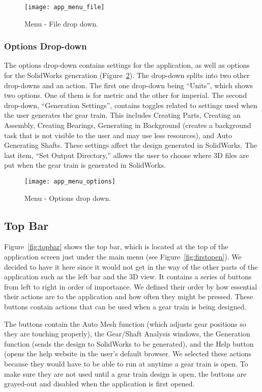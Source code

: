 \begin{doublespace}
\begin{figure}[htbp]
    \centering
    \texttt{[image: app\_menu\_file]}
    \caption{Menu - File drop down.}
    \label{fig:menufile}
\end{figure}

\subsubsection{Options Drop-down}

The options drop-down contains settings for the application, as well as options for the SolidWorks generation (Figure~\ref{fig:menuOptions}). The drop-down splits into two other drop-downs and an action. The first one drop-down being ``Units'', which shows two options. One of them is for metric and the other for imperial. The second drop-down, ``Generation Settings'', contains toggles related to settings used when the user generates the gear train. This includes Creating Parts, Creating an Assembly, Creating Bearings, Generating in Background (creates a background task that is not visible to the user and may use less resources), and Auto Generating Shafts. These settings affect the design generated in SolidWorks. The last item, ``Set Output Directory,'' allows the user to choose where 3D files are put when the gear train is generated in SolidWorks.

\begin{figure}[htbp]
    \centering
    \texttt{[image: app\_menu\_options]}
    \caption{Menu - Options drop down.}
    \label{fig:menuOptions}
\end{figure}

\subsection{Top Bar}

Figure~\ref{fig:topbar} shows the top bar, which is located at the top of the application screen just under the main menu (see Figure~\ref{fig:firstopen}). We decided to have it here since it would not get in the way of the other parts of the application such as the left bar and the 3D view. It contains a series of buttons from left to right in order of importance. We defined their order by how essential their actions are to the application and how often they might be pressed. These buttons contain actions that can be used when a gear train is being designed.

The buttons contain the Auto Mesh function (which adjusts gear positions so they are touching properly), the Gear/Shaft Analysis windows, the Generation function (sends the design to SolidWorks to be generated), and the Help button (opens the help website in the user's default browser. We selected these actions because they would have to be able to run at anytime a gear train is open. To make sure they are not used until a gear train design is open, the buttons are grayed-out and disabled when the application is first opened.


\end{doublespace}
